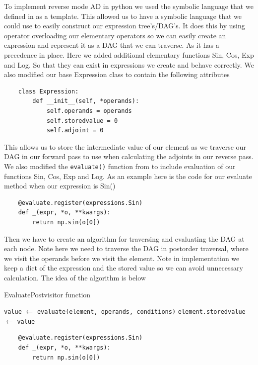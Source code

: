 \documentclass{article}
\begin{document}
To implement reverse mode AD in python we used the symbolic language that we defined in \cite{PoPBook} as a template. This allowed us to have a symbolic language that we could use to easily construct our expression tree's/DAG's. It does this by using operator overloading our elementary operators so we can easily create an expression and represent it as a DAG that we can traverse. As it has a precedence in place. Here we added additional elementary functions Sin, Cos, Exp and Log. So that they can exist in expressions we create and behave correctly. We also modified our base Expression class to contain the following attributes
\begin{verbatim}
    class Expression:
        def __init__(self, *operands):
            self.operands = operands
            self.storedvalue = 0
            self.adjoint = 0
\end{verbatim}
This allows us to store the intermediate value of our element as we traverse our DAG in our forward pass to use when calculating the adjoints in our reverse pass.
We also modified the \verb|evaluate()| function from \cite{PoPBook} to include evaluation of our functions Sin, Cos, Exp and Log. As an example here is the code for our evaluate method when our expression is Sin()
\begin{verbatim}
    @evaluate.register(expressions.Sin)
    def _(expr, *o, **kwargs):
        return np.sin(o[0])
\end{verbatim}
Then we have to create an algorithm for traversing and evaluating the DAG at each node. Note here we need to traverse the DAG in postorder traversal, where we visit the operands before we visit the element. Note in implementation we keep a dict of the expression and the stored value so we can avoid unnecessary calculation. The idea of the algorithm is below

\begin{algorithm}[h]
\caption{EvaluatePostvisitor function}\label{EvaluatePostvisitor}
\begin{algorithmic}[1]
\State \verb|value| $\gets$ \verb|evaluate(element, operands, conditions)|
\State \verb|element.storedvalue| $\gets$ \verb|value|
\EndFor
\EndProcedure
\end{algorithmic}
\end{algorithm}


\begin{verbatim}
    @evaluate.register(expressions.Sin)
    def _(expr, *o, **kwargs):
        return np.sin(o[0])
\end{verbatim}
\end{document}
